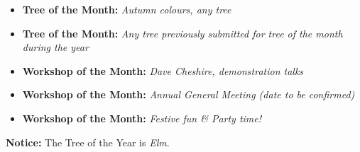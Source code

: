 \label{2025-09-calendar}
\vspace{-0.25em}
\vspace{-0.5em}
\begin{itemize}
    \item \textbf{Tree of the Month:} \textit{Autumn colours, any tree}
\end{itemize}

\vspace{-0.25em}
\vspace{-0.5em}
\begin{itemize}
    \item \textbf{Tree of the Month:} \textit{Any tree previously submitted for tree of the month during the year}
    \item \textbf{Workshop of the Month:} \textit{\textit{Dave Cheshire,} demonstration talks}
\end{itemize}

\vspace{-0.25em}
\vspace{-0.5em}
\begin{itemize}
    \item \textbf{Workshop of the Month:} \textit{Annual General Meeting (date to be confirmed)}
\end{itemize}

\vspace{-0.25em}
\vspace{-0.5em}
\begin{itemize}
    \item \textbf{Workshop of the Month:} \textit{Festive fun \& Party time!}
\end{itemize}

\noindent
\textbf{Notice:} The Tree of the Year is \textit{Elm}.
\closearticle
\vfill
